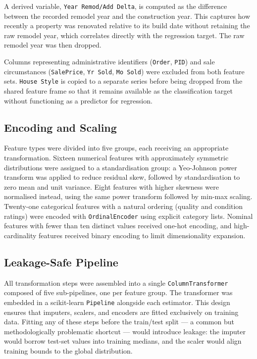 \documentclass[11pt,a4paper]{article}
\begin{document}
A derived variable, \texttt{Year\ Remod/Add\ Delta}, is computed as the
difference between the recorded remodel year and the construction year.
This captures how recently a property was renovated relative to its
build date without retaining the raw remodel year, which correlates
directly with the regression target. The raw remodel year was then
dropped.

Columns representing administrative identifiers (\texttt{Order},
\texttt{PID}) and sale circumstances (\texttt{SalePrice},
\texttt{Yr\ Sold}, \texttt{Mo\ Sold}) were excluded from both feature
sets. \texttt{House\ Style} is copied to a separate series before being
dropped from the shared feature frame so that it remains available as
the classification target without functioning as a predictor for
regression.

\subsection{Encoding and Scaling}\label{encoding-and-scaling}

Feature types were divided into five groups, each receiving an
appropriate transformation. Sixteen numerical features with
approximately symmetric distributions were assigned to a standardisation
group: a Yeo-Johnson power transform was applied to reduce residual
skew, followed by standardisation to zero mean and unit variance. Eight
features with higher skewness were normalised instead, using the same
power transform followed by min-max scaling. Twenty-one categorical
features with a natural ordering (quality and condition ratings) were
encoded with \texttt{OrdinalEncoder} using explicit category lists.
Nominal features with fewer than ten distinct values received one-hot
encoding, and high-cardinality features received binary encoding to
limit dimensionality expansion.

\subsection{Leakage-Safe Pipeline}\label{leakage-safe-pipeline}

All transformation steps were assembled into a single
\texttt{ColumnTransformer} composed of five sub-pipelines, one per
feature group. The transformer was embedded in a scikit-learn
\texttt{Pipeline} \autocite{Pedregosa2011} alongside each estimator.
This design ensures that imputers, scalers, and encoders are fitted
exclusively on training data. Fitting any of these steps before the
train/test split --- a common but methodologically problematic shortcut
--- would introduce leakage: the imputer would borrow test-set values
into training medians, and the scaler would align training bounds to the
global distribution.
\end{document}
